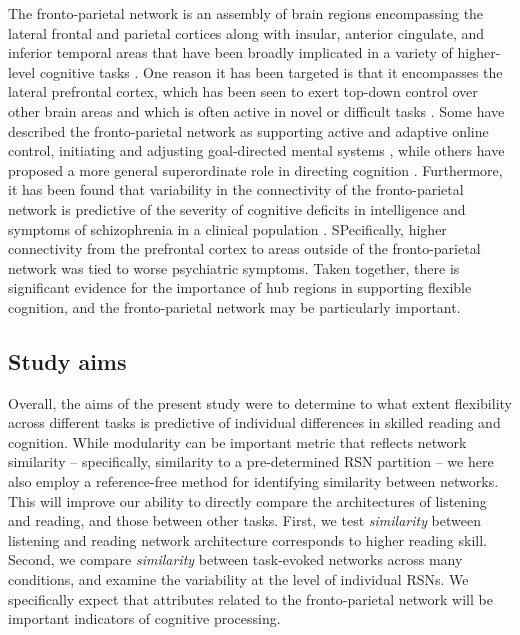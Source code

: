 The fronto-parietal network is an assembly of brain regions encompassing the lateral frontal and parietal cortices along with insular, anterior cingulate, and inferior temporal areas that have been broadly implicated in a variety of higher-level cognitive tasks \citep{Fedorenko2013}. One reason it has been targeted is that it encompasses the lateral prefrontal cortex, which has been seen to exert top-down control over other brain areas and which is often active in novel or difficult tasks \citep{Duncan2010}. Some have described the fronto-parietal network as supporting active and adaptive online control, initiating and adjusting goal-directed mental systems \citep{Dosenbach2007}, while others have proposed a more general superordinate role in directing cognition \citep{Niendam2012}.  Furthermore, it has been found that variability in the connectivity of the fronto-parietal network is predictive of the severity of cognitive deficits in intelligence and symptoms of schizophrenia in a clinical population \citep{Cole2011}. SPecifically, higher connectivity from the prefrontal cortex to areas outside of the fronto-parietal network was tied to worse psychiatric symptoms. Taken together, there is significant evidence for the importance of hub regions in supporting flexible cognition, and the fronto-parietal network may be particularly important. 

\subsection{Study aims}

Overall, the aims of the present study were to determine to what extent flexibility across different tasks is predictive of individual differences in skilled reading and cognition. While modularity can be important metric that reflects network similarity -- specifically, similarity to a pre-determined RSN partition -- we here also employ a reference-free method for identifying similarity between networks. This will improve our ability to directly compare the architectures of listening and reading, and those between other tasks. First, we test \textit{similarity} between listening and reading network architecture corresponds to higher reading skill. Second, we compare \textit{similarity} between task-evoked networks across many conditions, and examine the variability at the level of individual RSNs. We specifically expect that attributes related to the fronto-parietal network will be important indicators of cognitive processing.  

